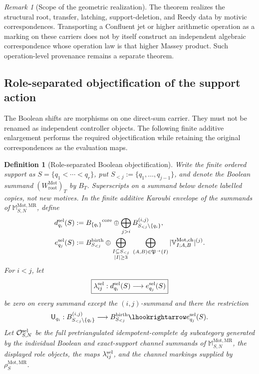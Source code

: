 \documentclass[11pt]{article}
\newtheorem{definition}[theorem]{Definition}
\theoremstyle{remark}
\newtheorem{remark}[theorem]{Remark}
\newcommand{\Mot}{\mathrm{Mot}}
\newcommand{\rootc}{\mathrm{root}}
\newcommand{\MR}{\mathrm{MR}}
\begin{document}
\begin{remark}[Scope of the geometric realization]
\label{P2M-rem:geometric-mr-scope}
The theorem realizes the structural root, transfer, latching, support-deletion,
and Reedy data by motivic correspondences.  Transporting a Confluent jet or
higher arithmetic operation as a marking on these carriers does not by itself
construct an independent algebraic correspondence whose operation law is that
higher Massey product.  Such operation-level provenance remains a separate
theorem.
\end{remark}

\subsection{Role-separated objectification of the support action}

The Boolean shifts are morphisms on one direct-sum carrier.  They must not be
renamed as independent controller objects.  The following finite additive
enlargement performs the required objectification while retaining the original
correspondences as the evaluation maps.

\begin{definition}[Role-separated Boolean objectification]
\label{P2M-def:role-separated-objectification}
Write the finite ordered support as
\(S=\{q_1<\cdots<q_r\}\), put
\(S_{<j}:=\{q_1,\ldots,q_{j-1}\}\), and denote the Boolean summand
\((W_{\rootc}^{\Mot})_T\) by \(B_T\).  Superscripts on a summand below denote
labelled copies, not new motives.  In the finite additive Karoubi envelope of
the summands of \(\mathbb M_{S,N}^{\Mot,\MR}\), define
\begin{align}
 d_{q_i}^{\rm sel}(S)
 &:={B_{\{q_i\}}}^{\rm core}
   \oplus\bigoplus_{j>i}
      B_{S_{<j}\setminus\{q_i\}}^{(i,j)},
 \label{P2M-eq:objectified-controller}\\
 e_{q_j}^{\rm sel}(S)
 &:=B_{S_{<j}}^{\rm birth}
 \oplus
 \bigoplus_{\substack{I\subseteq S_{<j}\\|I|\ge3}}
 \ \bigoplus_{(A,B)\in\mathfrak P^{\to}(I)}
 |\mathbb V_{I;A,B}^{\Mot,\mathrm{ch}}|^{(j)}.
 \label{P2M-eq:objectified-birth}
\end{align}
For \(i<j\), let
\begin{equation}
 \boxed{
 \lambda_{ij}^{\rm sel}:
 d_{q_i}^{\rm sel}(S)\longrightarrow e_{q_j}^{\rm sel}(S)}
 \label{P2M-eq:objectified-control-edge}
\end{equation}
be zero on every summand except the \((i,j)\)-summand and there the restriction
\[
 \mathsf U_{q_i}:
 B_{S_{<j}\setminus\{q_i\}}^{(i,j)}
 \longrightarrow B_{S_{<j}}^{\rm birth}
 \lhookrightarrow e_{q_j}^{\rm sel}(S).
\]
Let \(\mathcal O_{S,N}^{\rm sel}\) be the full pretriangulated idempotent-complete
dg subcategory generated by the individual Boolean and exact-support channel
summands of \(\mathbb M_{S,N}^{\Mot,\MR}\), the displayed role objects, the
maps \(\lambda_{ij}^{\rm sel}\), and the channel markings supplied by
\(\rho_S^{\Mot,\MR}\).
\end{definition}
\end{document}
